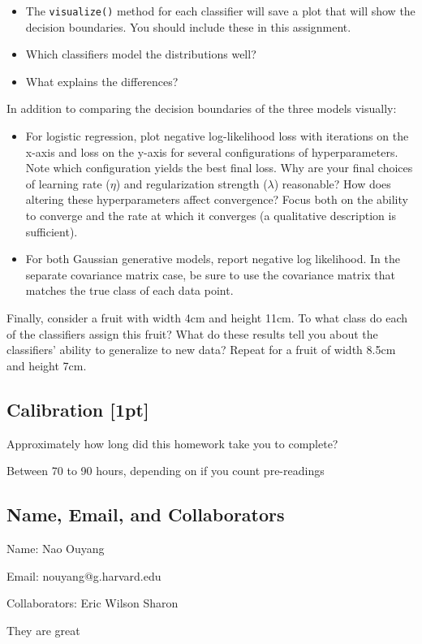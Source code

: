 \documentclass[submit]{harvardml}
\begin{document}
\begin{problem}
\begin{itemize}
\item The \texttt{visualize()} method for each classifier will save a plot that will show the decision boundaries. You should include these in this assignment.
\item Which classifiers model the distributions well?
\item What explains the differences?

\end{itemize}

In addition to comparing the decision boundaries of the three models visually:
\begin{itemize}

\item For logistic regression, plot negative log-likelihood loss with iterations on the x-axis and loss on the y-axis for several configurations of hyperparameters. Note which configuration yields the best final loss. Why are your final choices of learning rate ($\eta$) and regularization strength ($\lambda$) reasonable? How does altering these hyperparameters affect convergence? Focus both on the ability to converge and the rate at which it converges (a qualitative description is sufficient).

\item For both Gaussian generative models, report negative log likelihood. In the separate covariance matrix case, be sure to use the covariance matrix that matches the true class of each data point.

\end{itemize}

Finally, consider a fruit with width 4cm and height 11cm.  To what
class do each of the classifiers assign this fruit? What do these results tell you about the classifiers' ability to generalize to new data?  Repeat
for a fruit of width 8.5cm and height 7cm.

\end{problem}

\newpage
\subsection*{Calibration [1pt]}
Approximately how long did this homework take you to complete?

Between 70 to 90 hours, depending on if you count pre-readings

\subsection*{Name, Email, and Collaborators}

Name: Nao Ouyang

Email: nouyang@g.harvard.edu    

Collaborators:
Eric
Wilson
Sharon

They are great
\end{document}
